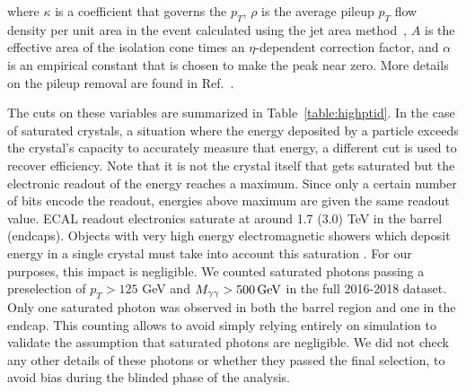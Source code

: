 where $\kappa$ is a coefficient that governs the $p_{T}$, $\rho$ is the average pileup $p_{T}$ flow density per unit area in the event calculated using the jet area method~\cite{Cacciari:2008gp, Cacciari:2011ma}, $A$ is the effective area of the isolation cone times an $\eta$-dependent correction factor, and $\alpha$ is an empirical constant that is chosen to make the \corphoiso peak near zero. More details on the pileup removal are found in Ref.~\cite{CMS:2020ebo}.

 
The cuts on these variables are summarized in Table~\ref{table:highptid}. In the case of saturated crystals, a situation where the energy deposited by a particle exceeds the crystal's capacity to accurately measure that energy, a different \sieie cut is used to recover efficiency. Note that it is not the crystal itself that gets saturated but the electronic readout of the energy reaches a maximum. Since only a certain number of bits encode the readout, energies above maximum are given the same readout value. ECAL readout electronics saturate at around 1.7 (3.0) TeV in the barrel (endcaps). Objects with very high energy electromagnetic showers which deposit energy in a single crystal must take into account this saturation \cite{saturation_readout, Clerbaux:2006kp}. For our purposes, this impact is negligible. We counted saturated photons passing a preselection of $p_{T} > 125$ GeV and $M_{\gamma\gamma} > 500\,\text{Ge\hspace{-.08em}V}$ in the full 2016-2018 dataset. Only one saturated photon was observed in both the barrel region and one in the endcap. This counting allows to avoid simply relying entirely on simulation to validate the assumption that saturated photons are negligible. We did not check any other details of these photons or whether they passed the final selection, to avoid bias during the blinded phase of the analysis. 

